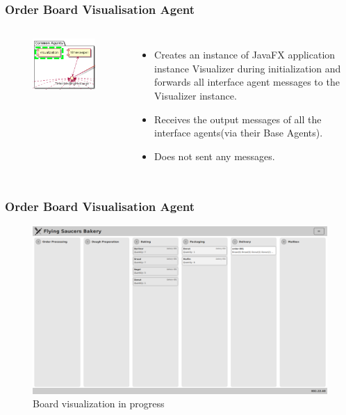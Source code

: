 \documentclass{beamer}
\begin{document}
\begin{frame}
    \frametitle{\huge{Order Board Visualisation Agent}}
    \begin{columns}[t]
        \begin{figure}[H]
            \centering
            \includegraphics[width=0.75\linewidth]{common_Visualization.png}
        \end{figure}
            \begin{itemize}
                \item Creates an instance of JavaFX application instance Visualizer during initialization and forwards all interface agent messages to the Visualizer instance.
                \item Receives the output messages of all the
interface agents(via their Base Agents).
                \item Does not sent any messages.
            \end{itemize}
    \end{columns}
\end{frame}

\begin{frame}
    \frametitle{\huge{Order Board Visualisation Agent}}
    \begin{figure}[H]
            \centering
            \includegraphics[width=0.99\linewidth]{visualizer-ui.png}
            \caption{Board visualization in progress}
        \end{figure}
\end{frame}
\end{document}
